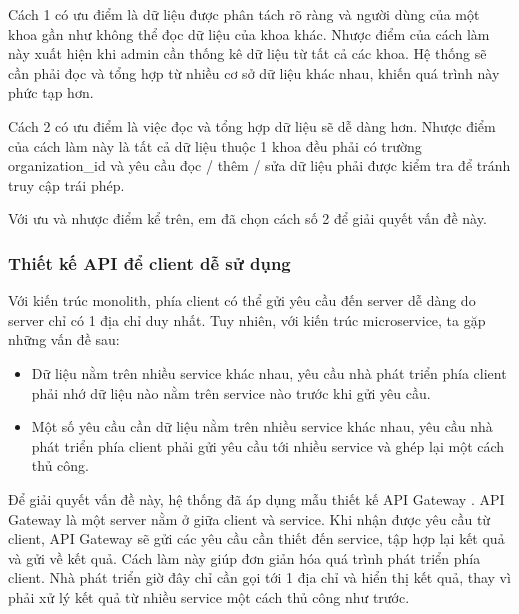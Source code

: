 \documentclass[./../main.tex]{subfiles}
\begin{document}
Cách 1 có ưu điểm là dữ liệu được phân tách rõ ràng và người dùng của
một khoa gần như không thể đọc dữ liệu của khoa khác. Nhược điểm của
cách làm này xuất hiện khi admin cần thống kê dữ liệu từ tất cả các
khoa. Hệ thống sẽ cần phải đọc và tổng hợp từ nhiều cơ sở dữ liệu khác
nhau, khiến quá trình này phức tạp hơn.

Cách 2 có ưu điểm là việc đọc và tổng hợp dữ liệu sẽ dễ dàng hơn. Nhược
điểm của cách làm này là tất cả dữ liệu thuộc 1 khoa đều phải có trường
organization\_id và yêu cầu đọc / thêm / sửa dữ liệu phải được kiểm tra
để tránh truy cập trái phép.

Với ưu và nhược điểm kể trên, em đã chọn cách số 2 để giải quyết vấn đề
này.

\hypertarget{thiux1ebft-kux1ebf-api-ux111ux1ec3-client-dux1ec5-sux1eed-dux1ee5ng}{%
	\subsubsection{Thiết kế API để client dễ sử
		dụng}\label{thiux1ebft-kux1ebf-api-ux111ux1ec3-client-dux1ec5-sux1eed-dux1ee5ng}}

Với kiến trúc monolith, phía client có thể gửi yêu cầu đến server dễ
dàng do server chỉ có 1 địa chỉ duy nhất. Tuy nhiên, với kiến trúc
microservice, ta gặp những vấn đề sau:

\begin{itemize}
	\item

	      Dữ liệu nằm trên nhiều service khác nhau, yêu cầu nhà phát triển phía
	      client phải nhớ dữ liệu nào nằm trên service nào trước khi gửi yêu
	      cầu.

	\item

	      Một số yêu cầu cần dữ liệu nằm trên nhiều service khác nhau, yêu cầu
	      nhà phát triển phía client phải gửi yêu cầu tới nhiều service và ghép
	      lại một cách thủ công.

\end{itemize}

Để giải quyết vấn đề này, hệ thống đã áp dụng mẫu thiết kế API Gateway \cite{Ric22}. API Gateway là một server nằm ở giữa client và service. Khi nhận được yêu cầu từ client, API Gateway sẽ gửi các yêu cầu cần thiết đến service, tập hợp lại kết quả và gửi về kết quả. Cách làm này giúp đơn giản hóa quá trình phát triển phía client. Nhà phát triển giờ đây chỉ cần gọi tới 1 địa chỉ và hiển thị kết quả, thay vì phải xử lý kết quả từ nhiều service một cách thủ công như trước.
\end{document}
